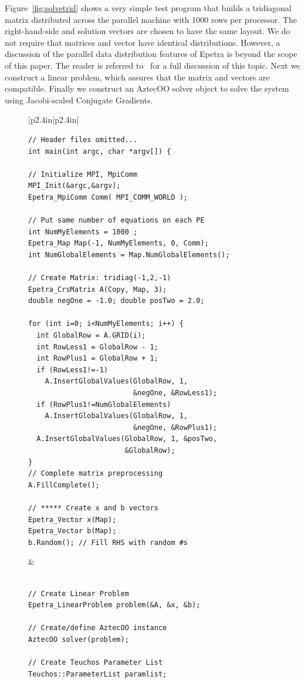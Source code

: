\documentclass[acmtoms,acmnow]{acmtrans2m}
\begin{document}
Figure~\ref{fig:solvetrid} shows a very simple test program that
builds a tridiagonal matrix distributed across the parallel machine
with 1000 rows per processor.  The right-hand-side and solution
vectors are chosen to have the same layout.  We do not require that
matrices and vector have identical distributions.  However, a
discussion of the parallel data distribution features of Epetra is
beyond the scope of this paper.  The reader is referred
to~\cite{Repartitioning} for a full discussion of this topic.
Next we construct a linear problem, which assures that the matrix and
vectors are compatible.  Finally we construct an AztecOO solver object
to solve the system using Jacobi-scaled Conjugate Gradients.
\begin{figure}
{\scriptsize
\begin{tabular}{|p{2.4in}|p{2.4in}|}\hline
\begin{verbatim}
// Header files omitted...
int main(int argc, char *argv[]) {

// Initialize MPI, MpiComm
MPI_Init(&argc,&argv);
Epetra_MpiComm Comm( MPI_COMM_WORLD );
                     
// Put same number of equations on each PE   
int NumMyElements = 1000 ;
Epetra_Map Map(-1, NumMyElements, 0, Comm);
int NumGlobalElements = Map.NumGlobalElements();

// Create Matrix: tridiag(-1,2,-1) 
Epetra_CrsMatrix A(Copy, Map, 3);
double negOne = -1.0; double posTwo = 2.0;

for (int i=0; i<NumMyElements; i++) {
  int GlobalRow = A.GRID(i); 
  int RowLess1 = GlobalRow - 1; 
  int RowPlus1 = GlobalRow + 1;
  if (RowLess1!=-1) 
    A.InsertGlobalValues(GlobalRow, 1, 
                         &negOne, &RowLess1);
  if (RowPlus1!=NumGlobalElements) 
    A.InsertGlobalValues(GlobalRow, 1, 
                         &negOne, &RowPlus1);
  A.InsertGlobalValues(GlobalRow, 1, &posTwo, 
                       &GlobalRow);
}
// Complete matrix preprocessing
A.FillComplete(); 

// ***** Create x and b vectors 
Epetra_Vector x(Map);
Epetra_Vector b(Map);
b.Random(); // Fill RHS with random #s
\end{verbatim}
&
\begin{verbatim}

// Create Linear Problem 
Epetra_LinearProblem problem(&A, &x, &b);  

// Create/define AztecOO instance 
AztecOO solver(problem);

// Create Teuchos Parameter List
Teuchos::ParameterList paramlist;


\end{verbatim}
\end{tabular}}
\end{figure}
\end{document}
